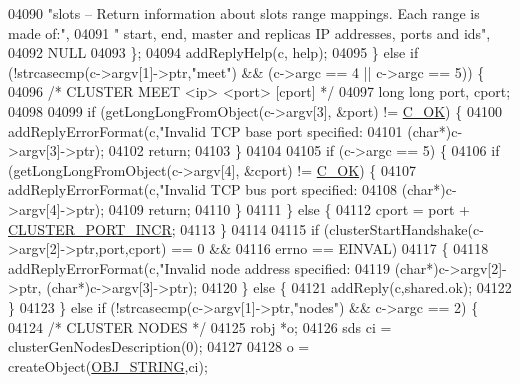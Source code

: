 \begin{DoxyCode}
{{{{{{{{{{{{{{{{{{{{{{{{{{{{{{{{{{{{{{{{{{{{{{{{{{{{{{{{{{{{{{{{{{{{{{{04090 \textcolor{stringliteral}{"slots -- Return information about slots range mappings. Each range is made of:"},
04091 \textcolor{stringliteral}{"    start, end, master and replicas IP addresses, ports and ids"},
04092 NULL
04093         \};
04094         addReplyHelp(c, help);
04095     \} \textcolor{keywordflow}{else} \textcolor{keywordflow}{if} (!strcasecmp(c->argv[1]->ptr,\textcolor{stringliteral}{"meet"}) && (c->argc == 4 || c->argc == 5)) \{
04096         \textcolor{comment}{/* CLUSTER MEET <ip> <port> [cport] */}
04097         \textcolor{keywordtype}{long} \textcolor{keywordtype}{long} port, cport;
04098 
04099         \textcolor{keywordflow}{if} (getLongLongFromObject(c->argv[3], &port) != \hyperlink{server_8h_a303769ef1065076e68731584e758d3e1}{C\_OK}) \{
04100             addReplyErrorFormat(c,\textcolor{stringliteral}{"Invalid TCP base port specified: %
04101                                 (\textcolor{keywordtype}{char}*)c->argv[3]->ptr);
04102             \textcolor{keywordflow}{return};
04103         \}
04104 
04105         \textcolor{keywordflow}{if} (c->argc == 5) \{
04106             \textcolor{keywordflow}{if} (getLongLongFromObject(c->argv[4], &cport) != \hyperlink{server_8h_a303769ef1065076e68731584e758d3e1}{C\_OK}) \{
04107                 addReplyErrorFormat(c,\textcolor{stringliteral}{"Invalid TCP bus port specified: %
04108                                     (\textcolor{keywordtype}{char}*)c->argv[4]->ptr);
04109                 \textcolor{keywordflow}{return};
04110             \}
04111         \} \textcolor{keywordflow}{else} \{
04112             cport = port + \hyperlink{cluster_8h_ac619a9ae48ab1431daa590fb5e75cea8}{CLUSTER\_PORT\_INCR};
04113         \}
04114 
04115         \textcolor{keywordflow}{if} (clusterStartHandshake(c->argv[2]->ptr,port,cport) == 0 &&
04116             errno == EINVAL)
04117         \{
04118             addReplyErrorFormat(c,\textcolor{stringliteral}{"Invalid node address specified: %
04119                             (\textcolor{keywordtype}{char}*)c->argv[2]->ptr, (\textcolor{keywordtype}{char}*)c->argv[3]->ptr);
04120         \} \textcolor{keywordflow}{else} \{
04121             addReply(c,shared.ok);
04122         \}
04123     \} \textcolor{keywordflow}{else} \textcolor{keywordflow}{if} (!strcasecmp(c->argv[1]->ptr,\textcolor{stringliteral}{"nodes"}) && c->argc == 2) \{
04124         \textcolor{comment}{/* CLUSTER NODES */}
04125         robj *o;
04126         sds ci = clusterGenNodesDescription(0);
04127 
04128         o = createObject(\hyperlink{server_8h_a65236ea160f69cdef33ec942092af88f}{OBJ\_STRING},ci);
}}}}}}}}}}}}}}}}}}}}}}}}}}}}}}}}}}}}}}}}}}}}}}}}}}}}}}}}}}}}}}}}}}}}}}}}}}
\end{DoxyCode}
